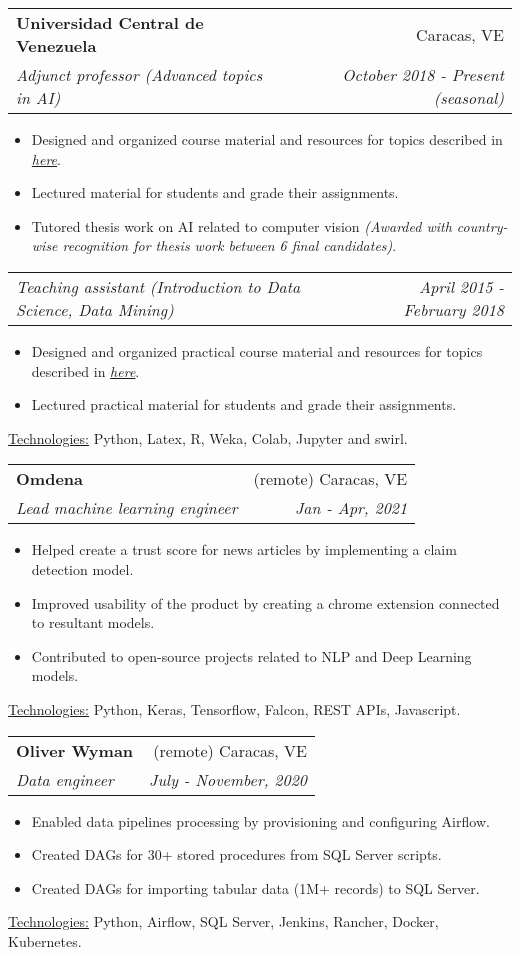 \documentclass[letterpaper,11pt]{article}
\makeatletter
\newcommand{\sepsection}{\vspace{25pt}}
\newcommand{\resumeItem}[1]{%
  \item\small{
    #1
  }
}
\newcommand{\resumeSubheading}[4]{
  \vspace{8pt}\item%
    \begin{tabular*}{0.97\textwidth}[t]{l@{\extracolsep{\fill}}r}
      \textbf{#1} & #2 \\
      \textit{\small#3} & \textit{\small #4} \\
    \end{tabular*}\vspace{-5pt}
}
\newcommand{\resumeSubSubheading}[2]{
    \vspace{1pt}
    \begin{tabular*}{0.97\textwidth}{l@{\extracolsep{\fill}}r}
      \textit{\small#1} & \textit{\small #2} \\
    \end{tabular*}\vspace{-5pt}
}
\newcommand{\resumeItemListStart}{\begin{itemize}}
\newcommand{\resumeItemListEnd}{\end{itemize}\vspace{-5pt}}
\newcommand{\resumeTech}[2]{
 \underline{#1:} #2
}
\makeatother
\begin{document}
    \resumeSubheading
      {Universidad Central de Venezuela}{Caracas, VE}
      {Adjunct professor (Advanced topics in AI)}{October 2018 - Present (seasonal)}
      \resumeItemListStart
      \resumeItem{Designed and organized course material and resources for topics described in \href{https://bit.ly/2VYchte}{\textsl{here}}.}
      \resumeItem{Lectured material for students and grade their assignments.}
      \resumeItem{Tutored thesis work on AI related to computer vision \newline \textsl{(Awarded with country-wise recognition for thesis work between 6 final candidates)}.}
      \resumeItemListEnd
    \resumeSubSubheading
      {Teaching assistant (Introduction to Data Science, Data Mining)}{April 2015 - February 2018}
     \resumeItemListStart
      \resumeItem{Designed and organized practical course material and resources for topics described in \href{https://bit.ly/2VYchte}{\textsl{here}}.}
      \resumeItem{Lectured practical material for students and grade their assignments.}
      \resumeItemListEnd
      \resumeTech{Technologies}{Python, Latex, R, Weka, Colab, Jupyter and swirl.}\\

    \resumeSubheading
      {Omdena}{(remote) Caracas, VE}
      {Lead machine learning engineer}{Jan - Apr, 2021}
      \resumeItemListStart
      \resumeItem{Helped create a trust score for news articles by implementing a claim detection model.}
      \resumeItem{Improved usability of the product by creating a chrome extension connected to resultant models.}
      \resumeItem{Contributed to open-source projects related to NLP and Deep Learning models.}
      \resumeItemListEnd
      \resumeTech{Technologies}{Python, Keras, Tensorflow, Falcon, REST APIs, Javascript.}\\

\sepsection
    \resumeSubheading
      {Oliver Wyman}{(remote) Caracas, VE}
      {Data engineer}{July - November, 2020}
      \resumeItemListStart
      \resumeItem{Enabled data pipelines processing by provisioning and configuring Airflow.}
      \resumeItem{Created DAGs for 30+ stored procedures from SQL Server scripts.}
      \resumeItem{Created DAGs for importing tabular data (1M+ records) to SQL Server.}
      \resumeItemListEnd
      \resumeTech{Technologies}{Python, Airflow, SQL Server, Jenkins, Rancher, Docker, Kubernetes.}\\
\end{document}
